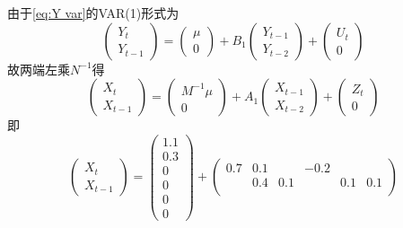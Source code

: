 \documentclass[cn]{homework}
\begin{document}
\begin{subproblem}[(\alph*)]
        \item
        由于\cref{eq:Y var}的VAR(1)形式为
        \[
            \begin{pmatrix}
                Y_t\\
                Y_{t-1}
            \end{pmatrix}
        =\begin{pmatrix}
            \mu \\
            0
        \end{pmatrix}
        +B_1\begin{pmatrix}
            Y_{t-1}\\
            Y_{t-2}
        \end{pmatrix}+
        \begin{pmatrix}
            U_t\\
            0
        \end{pmatrix}\]
        故两端左乘$N^{-1}$得
        \[\begin{pmatrix}
            X_t\\
            X_{t-1}
        \end{pmatrix}
        =\begin{pmatrix}
            M^{-1}\mu\\
            0
        \end{pmatrix}
        +A_1\begin{pmatrix}
            X_{t-1}\\
            X_{t-2}
        \end{pmatrix}
        +\begin{pmatrix}
            Z_t\\
            0
        \end{pmatrix}\]
        即
        \[\begin{pmatrix}
            X_t\\
            X_{t-1}
        \end{pmatrix}
        =\begin{pmatrix}
            1.1\\
            0.3\\
            0   \\
            0   \\
            0   \\
            0
        \end{pmatrix}
        +\begin{pmatrix}
            0.7 & 0.1 &     & -0.2 &     &     \\
                & 0.4 & 0.1 &      & 0.1 & 0.1 \\

\end{pmatrix}\]
\end{subproblem}
\end{document}
